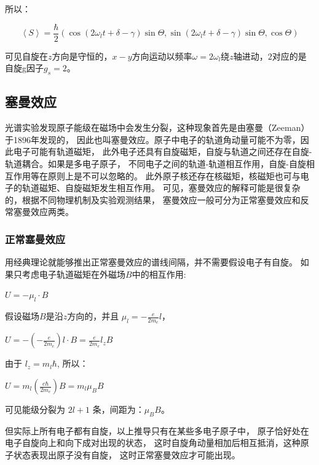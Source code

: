 所以：

\begin{equation*}
\left\langle S \right\rangle  = \frac{\hbar }{2}\left( {\cos (2\omega _l t + \delta  - \gamma )\sin \Theta ,\sin (2\omega _l t + \delta  - \gamma )\sin \Theta ,\cos \Theta } \right)
\end{equation*}

可见自旋在$z$方向是守恒的，$x-y$方向运动以频率$\omega = 2\omega _l
$绕$z$轴进动，$2$对应的是自旋g因子$g_s  = 2$。


\subsection{塞曼效应}

光谱实验发现原子能级在磁场中会发生分裂，这种现象首先是由塞曼（Zeeman）于1896年发现的，
因此也叫塞曼效应。原子中电子的轨道角动量可能不为零，因此电子可能有轨道磁矩，
此外电子还具有自旋磁矩，自旋与轨道之间还存在自旋-轨道耦合。如果是多电子原子，
不同电子之间的轨道-轨道相互作用，自旋-自旋相互作用等在原则上是不可以忽略的。
此外原子核还存在核磁矩，核磁矩也可与电子的轨道磁矩、自旋磁矩发生相互作用。
可见，塞曼效应的解释可能是很复杂的，根据不同物理机制及实验观测结果，
塞曼效应一般可分为正常塞曼效应和反常塞曼效应两类。


\subsubsection{正常塞曼效应}

用经典理论就能够推出正常塞曼效应的谱线间隔，并不需要假设电子有自旋。
如果只考虑电子轨道磁矩在外磁场$B$中的相互作用:

$U = - \mu_l  \cdot  B $

假设磁场$B$是沿$z$方向的，并且 $\mu _l  =  - \frac{e}{{2m_e }}l$，

$U =  - \left( { - \frac{e}{{2m_e }}} \right)l \cdot B = \frac{e}{{2m_e }}l_z B$

由于 $l_z = m_l \hbar $, 所以：

$U = m_l \left( {\frac{{e\hbar }}{{2m_e }}} \right)B = m_l \mu _B B$

可见能级分裂为 $2l + 1$ 条，间距为：$\mu_B B$。

但实际上所有电子都有自旋，以上推导只有在某些多电子原子中，
原子恰好处在电子自旋向上和向下成对出现的状态，
这时自旋角动量相加后相互抵消，这种原子状态表现出原子没有自旋，
这时正常塞曼效应才可能出现。

